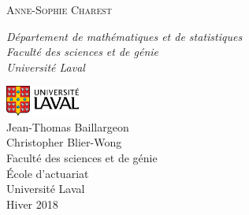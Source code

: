 \begin{titlepage}
	\vspace{0.5\baselineskip} %
	
	{\scshape\Large Anne-Sophie Charest \\} %
	
	\vspace{0.5\baselineskip} %
	
	\textit{Département de mathématiques et de statistiques\\Faculté des sciences et de génie\\Université Laval} %
	
	\vfill %
	
	
        
        \includegraphics[height=1cm]{UL_P.pdf}\\
        Jean-Thomas Baillargeon\\
        Christopher Blier-Wong\\
        Faculté des sciences et de génie\\
        École d'actuariat\\
        Université Laval\\
        Hiver 2018       
\end{titlepage}
